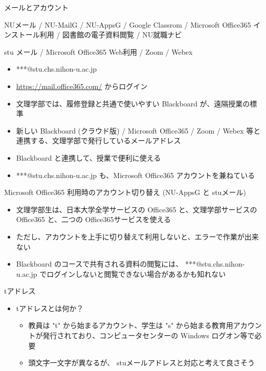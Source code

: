 \documentclass[a4j,10pt]{jsarticle}
\begin{document}
{\begin{frame}[label={sec:org4aad05a},fragile]{メールとアカウント}
\begin{block}{NUメール / NU-MailG / NU-AppsG / Google Classrom / Microsoft Office365 インストール利用 / 図書館の電子資料閲覧 / NU就職ナビ}
\begin{itemize}
\begin{itemize}
\end{itemize}
\end{itemize}
\end{block}
\par
\begin{block}{stu メール / Microsoft Office365 Web利用 / Zoom / Webex}
\begin{itemize}
\item ***@stu.chs.nihon-u.ac.jp
\item \url{https://mail.office365.com/} からログイン
\item 文理学部では、履修登録と共通で使いやすい Blackboard が、遠隔授業の標準
\item 新しい Blackboard (クラウド版) / Microsoft Office365 / Zoom / Webex 等と連携する、文理学部で発行しているメールアドレス
\item Blackboard と連携して、授業で便利に使える
\item ***@stu.chs.nihon-u.ac.jp も、Microsoft Office365 アカウントを兼ねている
\end{itemize}
\end{block}
\par
\begin{block}{Microsoft Office365 利用時のアカウント切り替え (NU-AppsG と stuメール)}
\begin{itemize}
\item 文理学部生は、日本大学全学サービスの Office365 と、文理学部サービスの Office365 と、二つの Office365サービスを使える
\item ただし、アカウントを上手に切り替えて利用しないと、エラーで作業が出来ない
\item Blackboard のコースで共有される資料の閲覧には、  ***@stu.chs.nihon-u.ac.jp でログインしないと閲覧できない場合があるかも知れない
\end{itemize}
\end{block}
\par
\begin{block}{tアドレス}
\begin{itemize}
\item tアドレスとは何か？
\begin{itemize}
\item 教員は "t" から始まるアカウント、学生は "s" から始まる教育用アカウントが発行されており、コンピュータセンターの Windows ログオン等で必要
\item 頭文字一文字が異なるが、 stuメールアドレスと対応と考えて良さそう
\end{itemize}
\par

\end{itemize}
\end{block}
\end{frame}}
\end{document}

